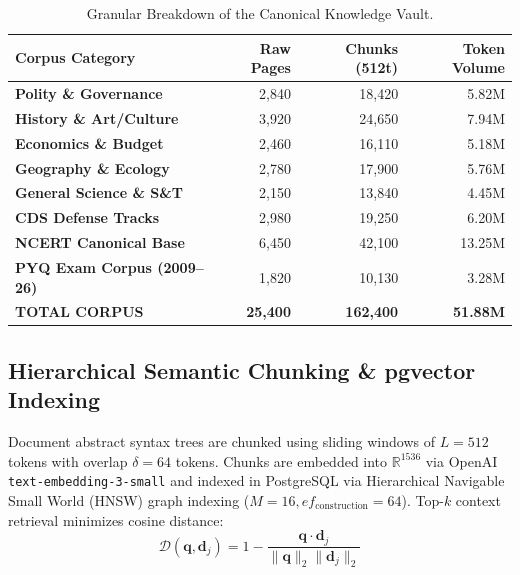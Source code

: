 \documentclass[conference]{IEEEtran}
\begin{document}
\begin{table}[h]
\centering
\caption{Granular Breakdown of the Canonical Knowledge Vault.}
\label{tab:vault_corpus}
\small
\begin{tabularx}{\columnwidth}{lrrr}
\toprule
\textbf{Corpus Category} & \textbf{Raw Pages} & \textbf{Chunks (512t)} & \textbf{Token Volume} \\
\midrule
\textbf{Polity \& Governance} & 2,840 & 18,420 & 5.82M \\
\textbf{History \& Art/Culture} & 3,920 & 24,650 & 7.94M \\
\textbf{Economics \& Budget} & 2,460 & 16,110 & 5.18M \\
\textbf{Geography \& Ecology} & 2,780 & 17,900 & 5.76M \\
\textbf{General Science \& S\&T} & 2,150 & 13,840 & 4.45M \\
\textbf{CDS Defense Tracks} & 2,980 & 19,250 & 6.20M \\
\textbf{NCERT Canonical Base} & 6,450 & 42,100 & 13.25M \\
\textbf{PYQ Exam Corpus (2009--26)} & 1,820 & 10,130 & 3.28M \\
\midrule
\textbf{TOTAL CORPUS} & \textbf{25,400} & \textbf{162,400} & \textbf{51.88M} \\
\bottomrule
\end{tabularx}
\end{table}

\subsection{Hierarchical Semantic Chunking \& pgvector Indexing}
Document abstract syntax trees are chunked using sliding windows of $L = 512$ tokens with overlap $\delta = 64$ tokens. Chunks are embedded into $\mathbb{R}^{1536}$ via OpenAI \texttt{text-embedding-3-small} and indexed in PostgreSQL via Hierarchical Navigable Small World (HNSW) graph indexing ($M = 16, ef_{\text{construction}} = 64$). Top-$k$ context retrieval minimizes cosine distance:
\begin{equation}
    \mathcal{D}(\mathbf{q}, \mathbf{d}_j) = 1 - \frac{\mathbf{q} \cdot \mathbf{d}_j}{\|\mathbf{q}\|_2 \|\mathbf{d}_j\|_2}
    \label{eq:cosine_dist}
\end{equation}

\end{document}
